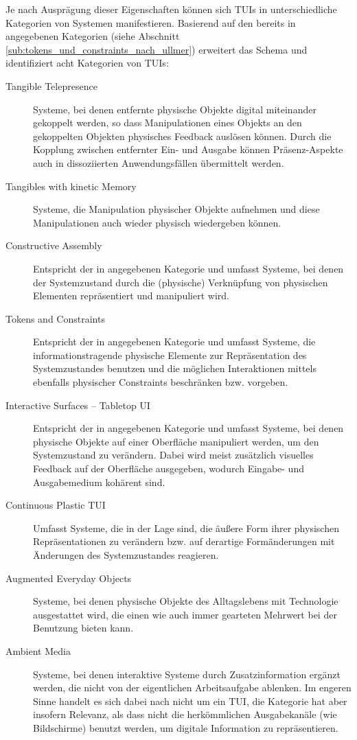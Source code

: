 Je nach Ausprägung dieser Eigenschaften können sich \glspl{TUI} in unterschiedliche Kategorien von Systemen manifestieren. Basierend auf den bereits in \citep{Ullmer05} angegebenen Kategorien (siehe Abschnitt \ref{sub:tokens_und_constraints_nach_ullmer}) erweitert \citeauthor{Ishii08} das Schema und identifiziert acht Kategorien von \glspl{TUI}:
\begin{description}
	\item[Tangible Telepresence] Systeme, bei denen entfernte physische Objekte digital miteinander gekoppelt werden, so dass Manipulationen eines Objekts an den gekoppelten Objekten physisches Feedback auslösen können. Durch die Kopplung zwischen entfernter Ein- und Ausgabe können Präsenz-Aspekte auch in dissoziierten Anwendungsfällen übermittelt werden.
	\item[Tangibles with kinetic Memory] Systeme, die Manipulation physischer Objekte aufnehmen und diese Manipulationen auch wieder physisch wiedergeben können.
	\item[Constructive Assembly] Entspricht der in \citep{Ullmer05} angegebenen Kategorie und umfasst Systeme, bei denen der Systemzustand durch die (physische) Verknüpfung von physischen Elementen repräsentiert und manipuliert wird.
	\item[Tokens and Constraints] Entspricht der in \citep{Ullmer05} angegebenen Kategorie und umfasst Systeme, die informationstragende physische Elemente zur Repräsentation des Systemzustandes benutzen und die möglichen Interaktionen mittels ebenfalls physischer Constraints beschränken bzw. vorgeben.
	\item[Interactive Surfaces -- Tabletop UI] Entspricht der in \citep{Ullmer05} angegebenen Kategorie und umfasst Systeme, bei denen physische Objekte auf einer Oberfläche manipuliert werden, um den Systemzustand zu verändern. Dabei wird meist zusätzlich visuelles Feedback auf der Oberfläche ausgegeben, wodurch Eingabe- und Ausgabemedium kohärent sind.
	\item[Continuous Plastic TUI] Umfasst Systeme, die in der Lage sind, die äußere Form ihrer physischen Repräsentationen zu verändern bzw. auf derartige Formänderungen mit Änderungen des Systemzustandes reagieren.
	\item[Augmented Everyday Objects] Systeme, bei denen physische Objekte des Alltagslebens mit Technologie ausgestattet wird, die einen wie auch immer gearteten Mehrwert bei der Benutzung bieten kann.
	\item[Ambient Media] Systeme, bei denen interaktive Systeme durch Zusatzinformation ergänzt werden, die nicht von der eigentlichen Arbeitsaufgabe ablenken. Im engeren Sinne handelt es sich dabei nach \citeauthor{Ishii08} nicht um ein \gls{TUI}, die Kategorie hat aber insofern Relevanz, als dass nicht die herkömmlichen Ausgabekanäle (wie Bildschirme) benutzt werden, um digitale Information zu repräsentieren.
\end{description}

